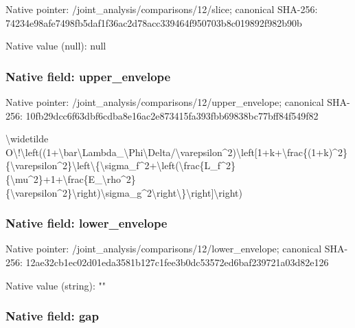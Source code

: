 \documentclass[10pt,a4paper]{article}
\begin{document}
Native pointer: /joint\_analysis/comparisons/12/slice; canonical SHA-256: 74234e98afe7498fb5daf1f3\allowbreak{}6ac2d78acc339464f950703b\allowbreak{}8c019892f982b90b



Native value (null): null



\subsubsection{Native field: upper\_envelope}


Native pointer: /joint\_analysis/comparis\allowbreak{}ons/12/upper\_envelope; canonical SHA-256: 10fb29dcc6f63dbf6cdba8e1\allowbreak{}6ac2e873415fa393fbb69838\allowbreak{}bc77bff84f549f82


\textbackslash{}widetilde O\textbackslash{}!\textbackslash{}left((1+\textbackslash{}bar\textbackslash{}Lambda\_\allowbreak{}\textbackslash{}Phi\textbackslash{}Delta/\textbackslash{}varepsilon\textasciicircum{}2\allowbreak{})\textbackslash{}left[1+k+\textbackslash{}frac\{(1+k)\textasciicircum{}2\allowbreak{}\}\{\textbackslash{}varepsilon\textasciicircum{}2\}\textbackslash{}left\textbackslash{}\{\textbackslash{}\allowbreak{}sigma\_f\textasciicircum{}2+\textbackslash{}left(\textbackslash{}frac\{L\_\allowbreak{}f\textasciicircum{}2\}\{\textbackslash{}mu\textasciicircum{}2\}+1+\textbackslash{}frac\{E\_\textbackslash{}r\allowbreak{}ho\textasciicircum{}2\}\{\textbackslash{}varepsilon\textasciicircum{}2\}\textbackslash{}rig\allowbreak{}ht)\textbackslash{}sigma\_g\textasciicircum{}2\textbackslash{}right\textbackslash{}\}\textbackslash{}ri\allowbreak{}ght]\textbackslash{}right)


\subsubsection{Native field: lower\_envelope}


Native pointer: /joint\_analysis/comparis\allowbreak{}ons/12/lower\_envelope; canonical SHA-256: 12ae32cb1ec02d01eda3581b\allowbreak{}127c1fee3b0dc53572ed6baf\allowbreak{}239721a03d82e126



Native value (string): ""



\subsubsection{Native field: gap}
\end{document}

